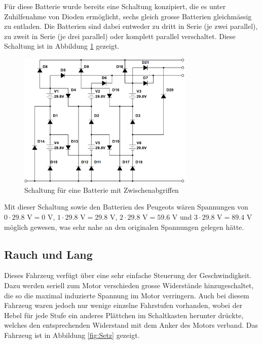 Für diese Batterie wurde bereits eine Schaltung konzipiert, die es unter Zuhilfenahme von Dioden ermöglicht, sechs gleich grosse Batterien gleichmässig zu entladen. Die Batterien sind dabei entweder zu dritt in Serie (je zwei parallel), zu zweit in Serie (je drei parallel) oder komplett parallel verschaltet. Diese Schaltung ist in Abbildung \ref{fig:68} gezeigt.

\begin{figure}[h!]
	\centering
		\includegraphics[width=0.75\textwidth]{images/68.PNG}
	\caption{Schaltung für eine Batterie mit Zwischenabgriffen}
	\label{fig:68}
\end{figure}

Mit dieser Schaltung sowie den Batterien des Peugeots wären Spannungen von $0\cdot29.8$ V$=0$ V, $1\cdot29.8$ V$=29.8$ V, $2\cdot29.8$ V$=59.6$ V und $3\cdot29.8$ V$=89.4$ V möglich gewesen, was sehr nahe an den originalen Spannungen gelegen hätte.

\subsection{Rauch und Lang}
Dieses Fahrzeug verfügt über eine sehr einfache Steuerung der Geschwindigkeit. Dazu werden seriell zum Motor verschieden grosse Widerstände hinzugeschaltet, die so die maximal induzierte Spannung im Motor verringern. Auch bei diesem Fahrzeug waren jedoch nur wenige einzelne Fahrstufen vorhanden, wobei der Hebel für jede Stufe ein anderes Plättchen im Schaltkasten herunter drückte, welches den entsprechenden Widerstand mit dem Anker des Motors verband. Das Fahrzeug ist in Abbildung \ref{fig:Setz} gezeigt.

